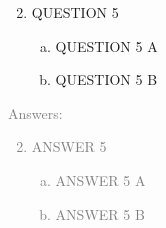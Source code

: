 \documentclass[11pt]{article}
\begin{document}
\begin{enumerate}
	\setcounter{enumi}{1}
	\item QUESTION 5
	\begin{enumerate}[(a)]
		\item QUESTION  5 A
		\item QUESTION  5 B  
	\end{enumerate}
\end{enumerate}
\textcolor{gray}{
Answers:
\begin{enumerate}
	\setcounter{enumi}{1}
	\item ANSWER  5 
	\begin{enumerate}[(a)]
		\item ANSWER  5 A
		\item ANSWER  5 B  
	\end{enumerate}
\end{enumerate}
}
\end{document}
